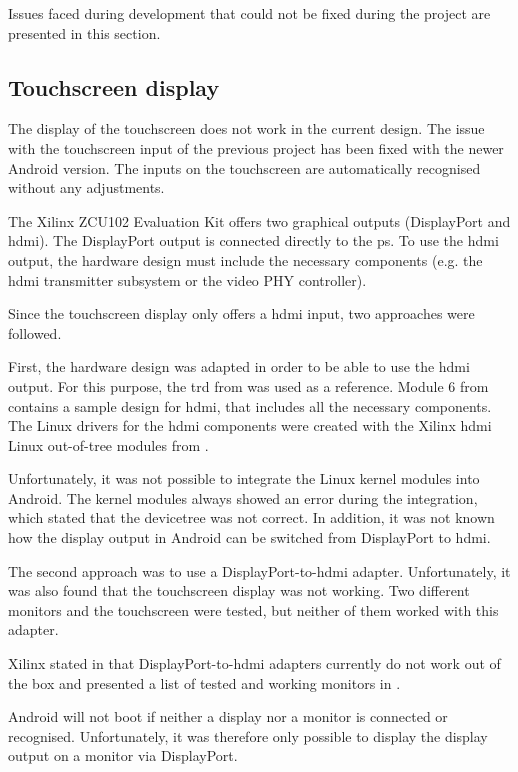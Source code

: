 Issues faced during development that could not be fixed during the project are presented in this section.

\subsection{Touchscreen display}
The display of the touchscreen does not work in the current design. The issue with the touchscreen input of the previous project \cite{oldrepo} has been fixed with the newer Android version. The inputs on the touchscreen are automatically recognised without any adjustments.

The Xilinx ZCU102 Evaluation Kit offers two graphical outputs (DisplayPort and \gls{hdmi}). The DisplayPort output is connected directly to the \gls{ps}. To use the \gls{hdmi} output, the hardware design must include the necessary components (e.g. the \gls{hdmi} transmitter subsystem or the video PHY controller).

Since the touchscreen display only offers a \gls{hdmi} input, two approaches were followed.

First, the hardware design was adapted in order to be able to use the \gls{hdmi} output.
For this purpose, the \gls{trd} from \cite{TRDReferenceDesign} was used as a reference. Module 6 from \cite{TRDReferenceDesign} contains a sample design for \gls{hdmi}, that includes all the necessary components. The Linux drivers for the \gls{hdmi} components were created with the Xilinx \gls{hdmi} Linux out-of-tree modules from \cite{hdmi-modules}. 

Unfortunately, it was not possible to integrate the Linux kernel modules into Android. The kernel modules always showed an error during the integration, which stated that the devicetree was not correct. In addition, it was not known how the display output in Android can be switched from DisplayPort to \gls{hdmi}.

The second approach was to use a DisplayPort-to-\gls{hdmi} adapter. Unfortunately, it was also found that the touchscreen display was not working. Two different monitors and the touchscreen were tested, but neither of them worked with this adapter.

Xilinx stated in \cite{AR67462} that DisplayPort-to-\gls{hdmi} adapters currently do not work out of the box and presented a list of tested and working monitors in \cite{AR68671}.

Android will not boot if neither a display nor a monitor is connected or recognised.
Unfortunately, it was therefore only possible to display the display output on a monitor via DisplayPort.
